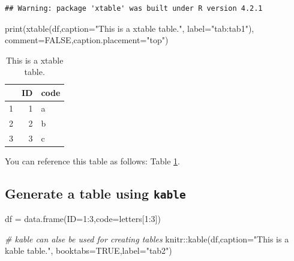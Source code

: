 \documentclass[webpdf,large,contemporary,namedate]{oup-authoring-template}
\newenvironment{Shaded}{\begin{snugshade}}{\end{snugshade}}
\newcommand{\AttributeTok}[1]{\textcolor[rgb]{0.77,0.63,0.00}{#1}}
\newcommand{\CommentTok}[1]{\textcolor[rgb]{0.56,0.35,0.01}{\textit{#1}}}
\newcommand{\ConstantTok}[1]{\textcolor[rgb]{0.00,0.00,0.00}{#1}}
\newcommand{\DecValTok}[1]{\textcolor[rgb]{0.00,0.00,0.81}{#1}}
\newcommand{\FunctionTok}[1]{\textcolor[rgb]{0.00,0.00,0.00}{#1}}
\newcommand{\NormalTok}[1]{#1}
\newcommand{\OtherTok}[1]{\textcolor[rgb]{0.56,0.35,0.01}{#1}}
\newcommand{\SpecialCharTok}[1]{\textcolor[rgb]{0.00,0.00,0.00}{#1}}
\newcommand{\StringTok}[1]{\textcolor[rgb]{0.31,0.60,0.02}{#1}}
\theoremstyle{thmstyleone}
\theoremstyle{thmstyletwo}
\theoremstyle{thmstylethree}
\begin{document}
\begin{verbatim}
## Warning: package 'xtable' was built under R version 4.2.1
\end{verbatim}

\begin{Shaded}
\begin{Highlighting}[]
\FunctionTok{print}\NormalTok{(}\FunctionTok{xtable}\NormalTok{(df,}\AttributeTok{caption=}\StringTok{"This is a xtable table."}\NormalTok{,}
             \AttributeTok{label=}\StringTok{"tab:tab1"}\NormalTok{),}
      \AttributeTok{comment=}\ConstantTok{FALSE}\NormalTok{,}\AttributeTok{caption.placement=}\StringTok{"top"}\NormalTok{)}
\end{Highlighting}
\end{Shaded}

\begin{table}[ht]
\centering
\caption{This is a xtable table.} 
\label{tab:tab1}
\begin{tabular}{rrl}
  \hline
 & ID & code \\ 
  \hline
1 &   1 & a \\ 
  2 &   2 & b \\ 
  3 &   3 & c \\ 
   \hline
\end{tabular}
\end{table}

You can reference this table as follows: Table \ref{tab:tab1}.

\hypertarget{generate-a-table-using-kable}{%
\subsection{\texorpdfstring{Generate a table using
\texttt{kable}}{Generate a table using kable}}\label{generate-a-table-using-kable}}

\begin{Shaded}
\begin{Highlighting}[]
\NormalTok{df }\OtherTok{=} \FunctionTok{data.frame}\NormalTok{(}\AttributeTok{ID=}\DecValTok{1}\SpecialCharTok{:}\DecValTok{3}\NormalTok{,}\AttributeTok{code=}\NormalTok{letters[}\DecValTok{1}\SpecialCharTok{:}\DecValTok{3}\NormalTok{])}

\CommentTok{\# kable can alse be used for creating tables}
\NormalTok{knitr}\SpecialCharTok{::}\FunctionTok{kable}\NormalTok{(df,}\AttributeTok{caption=}\StringTok{"This is a kable table."}\NormalTok{,}
             \AttributeTok{booktabs=}\ConstantTok{TRUE}\NormalTok{,}\AttributeTok{label=}\StringTok{"tab2"}\NormalTok{)}
\end{Highlighting}
\end{Shaded}
\end{document}
